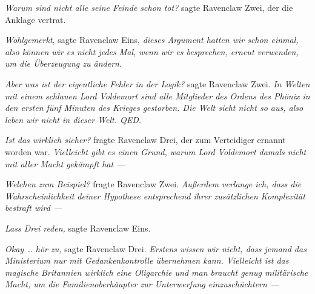 \emph{Warum sind nicht alle seine Feinde schon tot?} sagte Ravenclaw Zwei, der die Anklage vertrat.

\emph{Wohlgemerkt}, sagte Ravenclaw Eins, \emph{dieses Argument hatten wir schon einmal, also können wir es nicht jedes Mal, wenn wir es besprechen, erneut verwenden, um die Überzeugung zu ändern.}

\emph{Aber was ist der eigentliche Fehler in der Logik?} sagte Ravenclaw Zwei. \emph{In Welten mit einem schlauen Lord Voldemort sind alle Mitglieder des Ordens des Phönix in den ersten fünf Minuten des Krieges gestorben. Die Welt sieht nicht so aus, also leben wir nicht in dieser Welt. QED.}

\emph{Ist das wirklich sicher?} fragte Ravenclaw Drei, der zum Verteidiger ernannt worden war. \emph{Vielleicht gibt es einen Grund, warum Lord Voldemort damals nicht mit aller Macht gekämpft hat —}

\emph{Welchen zum Beispiel?} fragte Ravenclaw Zwei. \emph{Außerdem verlange ich, dass die Wahrscheinlichkeit deiner Hypothese entsprechend ihrer zusätzlichen Komplexität bestraft wird —}

\emph{Lass Drei reden,} sagte Ravenclaw Eins.

\emph{Okay … hör zu,} sagte Ravenclaw Drei. \emph{Erstens wissen wir nicht, dass jemand das Ministerium nur mit Gedankenkontrolle übernehmen kann. Vielleicht ist das magische Britannien wirklich eine Oligarchie und man braucht genug militärische Macht, um die Familienoberhäupter zur Unterwerfung einzuschüchtern —}

